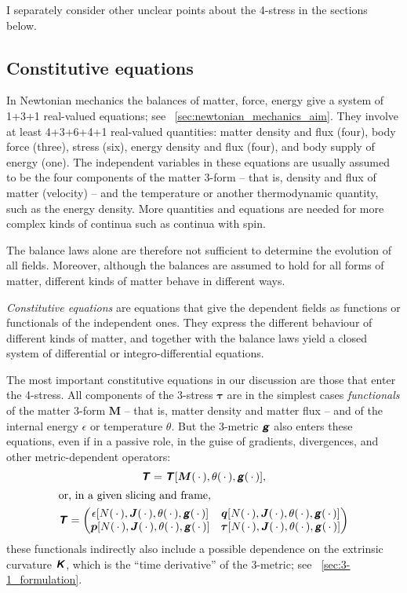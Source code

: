 \documentclass[\ifafour a4paper,12pt,\else a5paper,10pt,\fi%
onecolumn,oneside,article,%
british%
]{memoir}
\theoremstyle{remark}
\theoremstyle{innote}
\newcommand*{\mathte}[1]{\textbf{\textit{\textsf{#1}}}}
\newcommand*{\dotv}{\mathord{\,\cdot\,}}%
\renewcommand*{\|}[1][]{\nonscript\,#1\vert\nonscript\;\mathopen{}}
\newcommand*{\puzzle}{{\fontencoding{U}\fontfamily{fontawesometwo}\selectfont\symbol{225}}}
\newcommand*{\psect}{{\footnotesize\puzzle}}%
\newcommand*{\yd}{N}
\newcommand*{\yrr}{M}
\newcommand*{\yr}{\bm{\yrr}}
\newcommand*{\yjj}{J}
\newcommand*{\yj}{\bm{\yjj}}
\newcommand*{\yqq}{q}
\newcommand*{\yq}{\bm{\yqq}}
\newcommand*{\yTT}{\tau}
\newcommand*{\yT}{\bm{\yTT}}
\newcommand*{\yTTf}{T}
\newcommand*{\yTf}{\mathte{\yTTf}}
\newcommand*{\ygg}{g}
\newcommand*{\yg}{\mathte{\ygg}}
\newcommand*{\yKK}{K}
\newcommand*{\yK}{\mathte{\yKK}}
\newcommand*{\ypp}{p}
\newcommand*{\yp}{\bm{\ypp}}
\newcommand*{\ye}{\epsilon}
\newcommand*{\yte}{\theta}
\begin{document}
I separately consider other unclear points about the 4-stress in the
sections below.


\subsection{Constitutive equations}
\label{sec:constitutive equations}

In Newtonian mechanics the balances of matter, force, energy give a system
of 1+3+1 real-valued equations; see
\psect~\ref{sec:newtonian_mechanics_aim}. They involve at least 4+3+6+4+1
real-valued quantities: matter density and flux (four), body force (three),
stress (six), energy density and flux (four), and body supply of energy
(one). The independent variables in these equations are usually assumed to
be the four components of the matter 3-form -- that is, density and flux of
matter (velocity) -- and the temperature or another thermodynamic quantity,
such as the energy density. More quantities and equations are needed for
more complex kinds of continua such as continua with spin.

The balance laws alone are therefore not sufficient to determine the
evolution of all fields. Moreover, although the balances are assumed to
hold for all forms of matter, different kinds of matter behave in different
ways.

\emph{Constitutive equations} are equations that give the dependent fields
as functions or functionals of the independent ones. They express the
different behaviour of different kinds of matter, and together with the
balance laws yield a closed system of differential or integro-differential
equations.

The most important constitutive equations in our discussion are those that
enter the 4-stress. All components of the 3-stress $\yT$ are in the
simplest cases \emph{functionals} of the matter 3-form $\yr$ -- that is,
matter density and matter flux -- and of the internal energy $\ye$ or
temperature $\yte$. But the 3-metric $\yg$ also enters these equations,
even if in a passive role, in the guise of gradients, divergences, and
other metric-dependent operators:
\begin{subequations}\label{eq:constitutive_4stress}
  \begin{gather}
    \label{eq:constit_T_with_mass_geometry}
    \yTf=\yTf[\yr(\dotv),\yte(\dotv),\yg(\dotv)],
    \\
    \shortintertext{or, in a given slicing and frame,}
    \label{eq:4stress_components}
    \yTf =
    \begin{pmatrix}
      \ye[\yd(\dotv),\yj(\dotv),\yte(\dotv),\yg(\dotv)] & \yq[\yd(\dotv),\yj(\dotv),\yte(\dotv),\yg(\dotv)] \\
      \yp[\yd(\dotv),\yj(\dotv),\yte(\dotv),\yg(\dotv)] & \yT[\yd(\dotv),\yj(\dotv),\yte(\dotv),\yg(\dotv)]
    \end{pmatrix}
  \end{gather}
\end{subequations}
these functionals indirectly also include a possible dependence on the
extrinsic curvature $\yK$, which is the \enquote{time derivative} of the
3-metric; see \psect~\ref{sec:3-1_formulation}.
\end{document}
